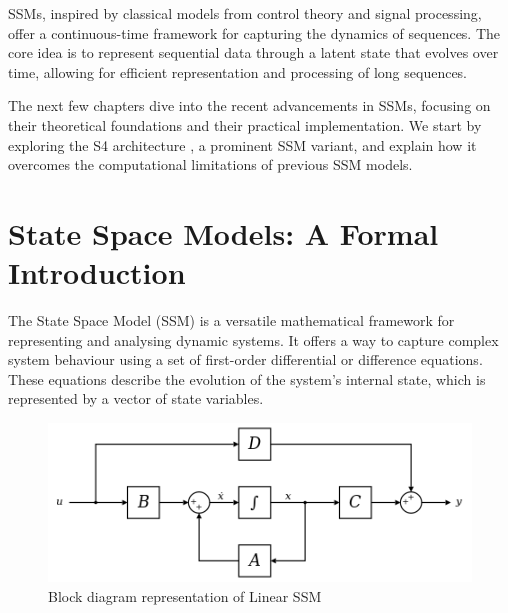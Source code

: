 \documentclass[12pt,a4paper]{report}
\begin{document}
\medskip

SSMs, inspired by classical models from control theory and signal processing, offer a continuous-time framework for capturing the dynamics of sequences. The core idea is to represent sequential data through a latent state that evolves over time, allowing for efficient representation and processing of long sequences.

\medskip

The next few chapters dive into the recent advancements in SSMs, focusing on their theoretical foundations and their practical implementation. We start by exploring the S4 architecture \cite{s4}, a prominent SSM variant, and explain how it overcomes the computational limitations of previous SSM models.

\section{State Space Models: A Formal Introduction}
The State Space Model (SSM) is a versatile mathematical framework for representing and analysing dynamic systems. It offers a way to capture complex system behaviour using a set of first-order differential or difference equations. These equations describe the evolution of the system's internal state, which is represented by a vector of state variables.

\begin{figure}[ht]
    \centerline{\includegraphics[scale=0.5]{C3.1_SSM.png}}
    \caption{Block diagram representation of Linear SSM}
    \label{ssm_bd}
\end{figure}
\end{document}
